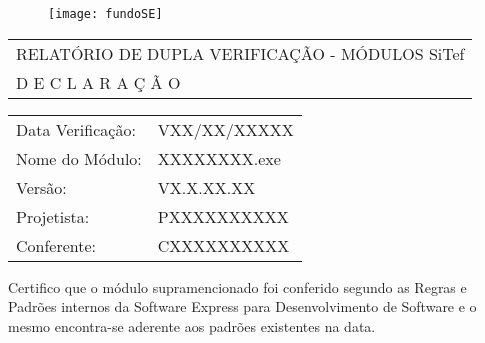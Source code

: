 \documentclass[a4paper]{article}
\begin{document}
\begin{figure}[H]
\texttt{[image: fundoSE]}
\end{figure}
\begin{table}[h]
    \begin{tabular}{|p{16.55cm}|}
    \cline{1-2}
    \setstretch{1.2} \centering RELATÓRIO DE DUPLA VERIFICAÇÃO - MÓDULOS SiTef\\
     D E C L A R A Ç Ã O 
    \cline{1-2}
    \end{tabular}%
\end{table}%
\newline
\newline
\newline
\newline
\begin{table}[htbp]
    \begin{tabular}{|lp{13.4cm}|}
    \cline{1-2}
    \toprule
    Data Verificação: & 
    VXX/XX/XXXXX 
    \\
    Nome do Módulo: & 
    XXXXXXXX.exe 
    \\
    Versão: & 
    VX.X.XX.XX 
    \\
    Projetista: & 
    PXXXXXXXXXX
    \\
    Conferente: & 
    CXXXXXXXXXX
    \\
    \cline{1-2}
    \bottomrule
    \end{tabular}%
\end{table}%
\newline
\newline
\begin{table}[htbp]
\end{table}%


\begin{flushleft}
 Certifico que o módulo supramencionado foi conferido segundo as Regras e Padrões internos da Software Express para Desenvolvimento de Software e o mesmo encontra-se aderente aos padrões existentes na data.
\newline
\newline
\newline
\newline
\newline
\newline
\newline
\end{flushleft}
\end{document}
